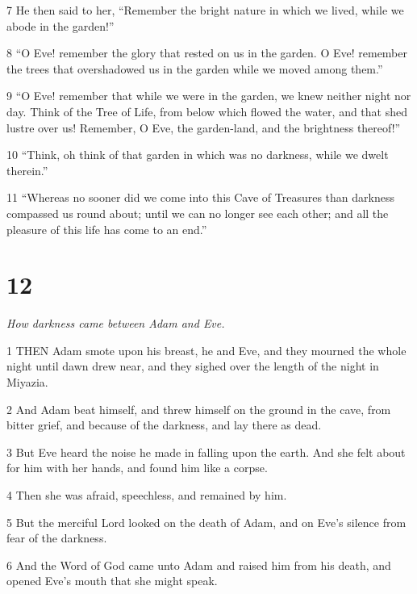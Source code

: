 \par 7 He then said to her, “Remember the bright nature in which we lived, while we abode in the garden!”

\par 8 “O Eve! remember the glory that rested on us in the garden. O Eve! remember the trees that overshadowed us in the garden while we moved among them.”

\par 9 “O Eve! remember that while we were in the garden, we knew neither night nor day. Think of the Tree of Life, from below which flowed the water, and that shed lustre over us! Remember, O Eve, the garden-land, and the brightness thereof!”

\par 10 “Think, oh think of that garden in which was no darkness, while we dwelt therein.”

\par 11 “Whereas no sooner did we come into this Cave of Treasures than darkness compassed us round about; until we can no longer see each other; and all the pleasure of this life has come to an end.”

\chapter{12}

\par \textit{How darkness came between Adam and Eve.}

\par 1 THEN Adam smote upon his breast, he and Eve, and they mourned the whole night until dawn drew near, and they sighed over the length of the night in Miyazia.

\par 2 And Adam beat himself, and threw himself on the ground in the cave, from bitter grief, and because of the darkness, and lay there as dead.

\par 3 But Eve heard the noise he made in falling upon the earth. And she felt about for him with her hands, and found him like a corpse.

\par 4 Then she was afraid, speechless, and remained by him.

\par 5 But the merciful Lord looked on the death of Adam, and on Eve's silence from fear of the darkness.

\par 6 And the Word of God came unto Adam and raised him from his death, and opened Eve's mouth that she might speak.


